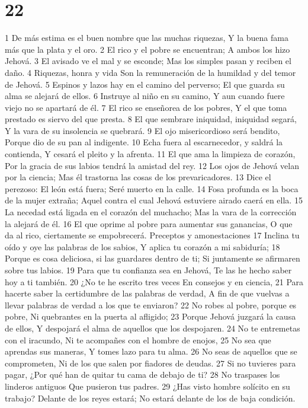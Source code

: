 \chapter{22}

1 De más estima es el buen nombre que las muchas riquezas,
Y la buena fama más que la plata y el oro.
2 El rico y el pobre se encuentran;
A ambos los hizo Jehová.
3 El avisado ve el mal y se esconde;
Mas los simples pasan y reciben el daño.
4 Riquezas, honra y vida
Son la remuneración de la humildad y del temor de Jehová.
5 Espinos y lazos hay en el camino del perverso;
El que guarda su alma se alejará de ellos.
6 Instruye al niño en su camino,
Y aun cuando fuere viejo no se apartará de él.
7 El rico se enseñorea de los pobres,
Y el que toma prestado es siervo del que presta.
8 El que sembrare iniquidad, iniquidad segará,
Y la vara de su insolencia se quebrará.
9 El ojo misericordioso será bendito,
Porque dio de su pan al indigente.
10 Echa fuera al escarnecedor, y saldrá la contienda,
Y cesará el pleito y la afrenta.
11 El que ama la limpieza de corazón,
Por la gracia de sus labios tendrá la amistad del rey.
12 Los ojos de Jehová velan por la ciencia;
Mas él trastorna las cosas de los prevaricadores.
13 Dice el perezoso: El león está fuera;
Seré muerto en la calle.
14 Fosa profunda es la boca de la mujer extraña;
Aquel contra el cual Jehová estuviere airado caerá en ella.
15 La necedad está ligada en el corazón del muchacho;
Mas la vara de la corrección la alejará de él.
16 El que oprime al pobre para aumentar sus ganancias, 
O que da al rico, ciertamente se empobrecerá.
Preceptos y amonestaciones
17 Inclina tu oído y oye las palabras de los sabios,
Y aplica tu corazón a mi sabiduría;
18 Porque es cosa deliciosa, si las guardares dentro de ti;
Si juntamente se afirmaren sobre tus labios.
19 Para que tu confianza sea en Jehová,
Te las he hecho saber hoy a ti también.
20 ¿No te he escrito tres veces
En consejos y en ciencia,
21 Para hacerte saber la certidumbre de las palabras de verdad,
A fin de que vuelvas a llevar palabras de verdad a los que te enviaron?
22 No robes al pobre, porque es pobre,
Ni quebrantes en la puerta al afligido;
23 Porque Jehová juzgará la causa de ellos,
Y despojará el alma de aquellos que los despojaren.
24 No te entremetas con el iracundo,
Ni te acompañes con el hombre de enojos,
25 No sea que aprendas sus maneras,
Y tomes lazo para tu alma.
26 No seas de aquellos que se comprometen,
Ni de los que salen por fiadores de deudas.
27 Si no tuvieres para pagar,
¿Por qué han de quitar tu cama de debajo de ti?
28 No traspases los linderos antiguos
Que pusieron tus padres.
29 ¿Has visto hombre solícito en su trabajo? Delante de los reyes estará;
No estará delante de los de baja condición.

